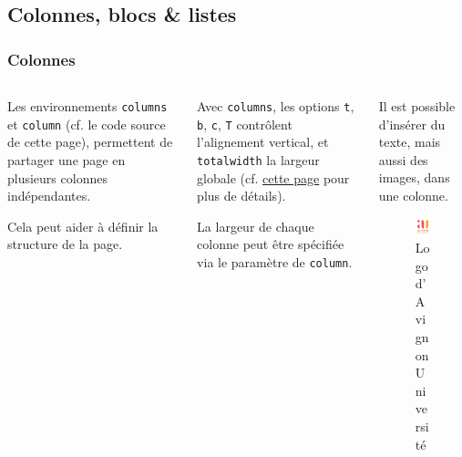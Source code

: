 \documentclass[10pt,    %
    french,             %
    xcolor=table,       %
    envcountsect        %
]{beamer}
\begin{document}
\subsection{Colonnes, blocs \& listes}
\begin{frame}
    \frametitle{Colonnes}
    
    \begin{columns}[T,totalwidth=\textwidth] %
        \begin{column}{0.33\textwidth}
            Les environnements \texttt{columns} et \texttt{column} (cf. le code source de cette page), permettent de partager une page en plusieurs colonnes indépendantes. 
            
            Cela peut aider à définir la structure de la page.
        \end{column}
        
        \begin{column}{0.33\textwidth}
            Avec \texttt{columns}, les options \texttt{t}, \texttt{b}, \texttt{c}, \texttt{T} contrôlent l'alignement vertical, et \texttt{totalwidth} la largeur globale (cf. \href{https://tex.stackexchange.com/a/51509/31360}{cette page} pour plus de détails).
            
            La largeur de chaque colonne peut être spécifiée via le paramètre de \texttt{column}.
        \end{column}
        
        \begin{column}{0.33\textwidth}
            Il est possible d'insérer du texte, mais aussi des images, dans une colonne.
            \begin{figure}[H]
                \centering
                \includegraphics[scale=1]{au/backgrounds/au_logo.pdf}
                \vspace{-0.5cm}
                \caption{Logo d'Avignon Université}
                \label{fig:AUlogo}
            \end{figure}
        \end{column}
    \end{columns}
\end{frame}
\end{document}
